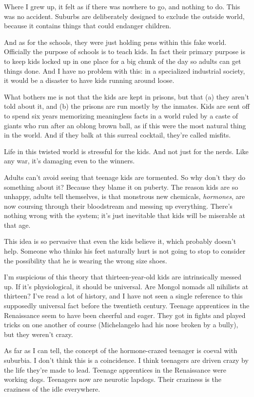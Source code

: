 \documentclass[12pt]{book}
\begin{document}
Where I grew up, it felt as if there was nowhere to go, and nothing to
do. This was no accident. Suburbs are deliberately designed to exclude
the outside world, because it contains things that could endanger
children.

And as for the schools, they were just holding pens within this fake
world. Officially the purpose of schools is to teach kids. In fact their
primary purpose is to keep kids locked up in one place for a big chunk
of the day so adults can get things done. And I have no problem with
this: in a specialized industrial society, it would be a disaster to
have kids running around loose.

What bothers me is not that the kids are kept in prisons, but that (a)
they aren't told about it, and (b) the prisons are run mostly by the
inmates. Kids are sent off to spend six years memorizing meaningless
facts in a world ruled by a caste of giants who run after an oblong
brown ball, as if this were the most natural thing in the world. And if
they balk at this surreal cocktail, they're called misfits.

Life in this twisted world is stressful for the kids. And not just for
the nerds. Like any war, it's damaging even to the winners.

Adults can't avoid seeing that teenage kids are tormented. So why don't
they do something about it? Because they blame it on puberty. The reason
kids are so unhappy, adults tell themselves, is that monstrous new
chemicals, \emph{hormones}, are now coursing through their bloodstream
and messing up everything. There's nothing wrong with the system; it's
just inevitable that kids will be miserable at that age.

This idea is so pervasive that even the kids believe it, which probably
doesn't help. Someone who thinks his feet naturally hurt is not going to
stop to consider the possibility that he is wearing the wrong size
shoes.

I'm suspicious of this theory that thirteen-year-old kids are
intrinsically messed up. If it's physiological, it should be universal.
Are Mongol nomads all nihilists at thirteen? I've read a lot of history,
and I have not seen a single reference to this supposedly universal fact
before the twentieth century. Teenage apprentices in the Renaissance
seem to have been cheerful and eager. They got in fights and played
tricks on one another of course (Michelangelo had his nose broken by a
bully), but they weren't crazy.

As far as I can tell, the concept of the hormone-crazed teenager is
coeval with suburbia. I don't think this is a coincidence. I think
teenagers are driven crazy by the life they're made to lead. Teenage
apprentices in the Renaissance were working dogs. Teenagers now are
neurotic lapdogs. Their craziness is the craziness of the idle
everywhere.
\end{document}
